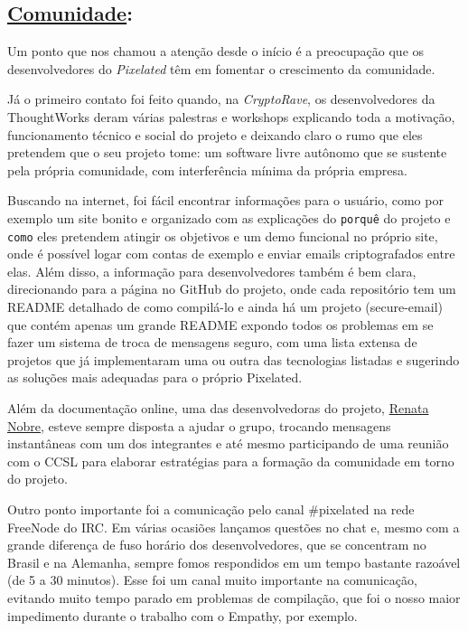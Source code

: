 \subsection*{\underline{Comunidade}:}

Um ponto que nos chamou a atenção desde o início é a preocupação que os
desenvolvedores do \emph{Pixelated} têm em fomentar o crescimento da comunidade.

Já o primeiro contato foi feito quando, na \emph{CryptoRave}, os desenvolvedores
da
ThoughtWorks deram várias palestras e workshops explicando toda a motivação,
funcionamento técnico e social do projeto e deixando claro o rumo que eles
pretendem que o seu projeto tome: um software livre autônomo que se sustente
pela
própria comunidade, com interferência mínima da própria empresa.

Buscando na internet, foi fácil encontrar informações para o usuário, como por
exemplo
um site bonito e organizado com as explicações do \texttt{porquê} do projeto e
\texttt{como} eles pretendem atingir os objetivos e um demo funcional no próprio
site, onde é possível logar com contas de exemplo e enviar emails
criptografados entre elas.
Além disso, a informação para desenvolvedores também é bem clara, direcionando
para a página no GitHub do projeto, onde cada repositório tem um README detalhado
de como compilá-lo e ainda há um projeto (secure-email) que contém apenas um
grande README expondo todos os problemas em se fazer um sistema de troca de
mensagens seguro, com uma lista extensa de projetos que já implementaram uma ou
outra das tecnologias listadas e sugerindo as soluções mais adequadas para o
próprio Pixelated.

Além da documentação online, uma das desenvolvedoras do projeto,
\href{https://github.com/re-nobre}{Renata Nobre},
esteve sempre disposta a ajudar o grupo, trocando mensagens instantâneas com um
dos integrantes e até mesmo participando de uma reunião com o CCSL para elaborar
estratégias para a formação da comunidade em torno do projeto.

Outro ponto importante foi a comunicação pelo canal \#pixelated na rede FreeNode
do IRC. Em várias ocasiões lançamos questões no chat e, mesmo com a grande
diferença de fuso horário dos desenvolvedores, que se concentram no Brasil e na
Alemanha, sempre fomos respondidos em um tempo bastante razoável
(de 5 a 30 minutos). Esse foi um canal muito importante na comunicação, evitando
muito tempo parado em problemas de compilação, que foi o nosso maior impedimento
durante o trabalho com o Empathy, por exemplo.

